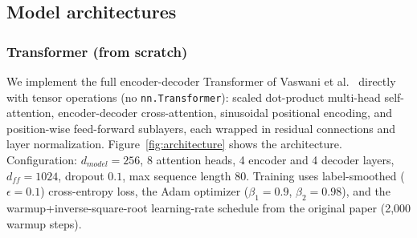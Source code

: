 \documentclass[conference]{IEEEtran}
\begin{document}
\subsection{Model architectures}

\subsubsection{Transformer (from scratch)}
We implement the full encoder-decoder Transformer of
Vaswani et al.~\cite{vaswani2017attention} directly with tensor operations
(no \texttt{nn.Transformer}): scaled dot-product multi-head self-attention,
encoder-decoder cross-attention, sinusoidal positional encoding, and
position-wise feed-forward sublayers, each wrapped in residual connections
and layer normalization. Figure~\ref{fig:architecture} shows the
architecture. Configuration: $d_{model}=256$, 8 attention heads, 4 encoder
and 4 decoder layers, $d_{ff}=1024$, dropout $0.1$, max sequence length 80.
Training uses label-smoothed ($\epsilon=0.1$) cross-entropy loss, the Adam
optimizer ($\beta_1=0.9$, $\beta_2=0.98$), and the warmup+inverse-square-root
learning-rate schedule from the original paper (2{,}000 warmup steps).
\end{document}
